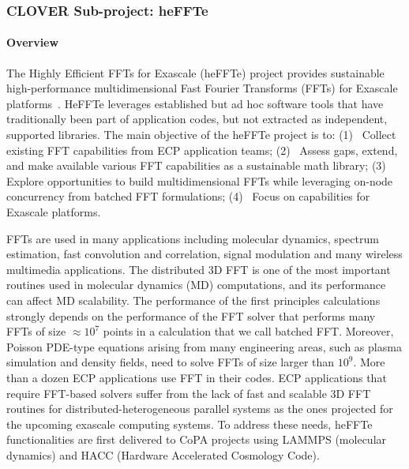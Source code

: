 \subsubsection{ CLOVER Sub-project: heFFTe}\label{subsubsect:fftecp}


\paragraph{Overview}

The Highly Efficient FFTs for Exascale (heFFTe) project provides sustainable 
high-performance multidimensional Fast Fourier Transforms (FFTs) for Exascale 
platforms~\cite{thasd19,heffte-iccs20}.
HeFFTe leverages established but ad hoc 
software tools that have traditionally been part of application 
codes, but not extracted as independent, supported libraries. 
%
The main objective of the heFFTe project is to:
(1)~ 
      Collect existing FFT capabilities from ECP 
      application teams;
(2)~
      Assess gaps, extend, and make available various FFT
      capabilities as a sustainable math library;
(3)~      
      Explore opportunities to build multidimensional FFTs
      while leveraging on-node concurrency from 
      batched FFT formulations;
(4)~
      Focus on capabilities for Exascale platforms.

FFTs are used in many applications including molecular dynamics, 
spectrum estimation, fast convolution and correlation, signal 
modulation and many wireless multimedia applications. The 
distributed 3D FFT is one of the most important routines used 
in molecular dynamics (MD) computations, and its performance can 
affect MD scalability. The performance of the first 
principles calculations strongly depends on the performance of the 
FFT solver that performs many FFTs of size $\approx 10^7$ points in 
a calculation that we call batched FFT. Moreover, Poisson PDE-type 
equations arising from many engineering areas, such as plasma
simulation and density fields, need to solve FFTs of size larger than $10^9$. 
%
More than a dozen ECP applications use FFT in their codes.
ECP applications that require FFT-based solvers suffer from the lack of 
fast and scalable 3D FFT routines for distributed-heterogeneous parallel 
systems as the ones projected for the upcoming exascale computing systems. 
To address these needs, heFFTe functionalities are first delivered 
to CoPA projects using LAMMPS (molecular dynamics) and HACC (Hardware Accelerated
Cosmology Code).

